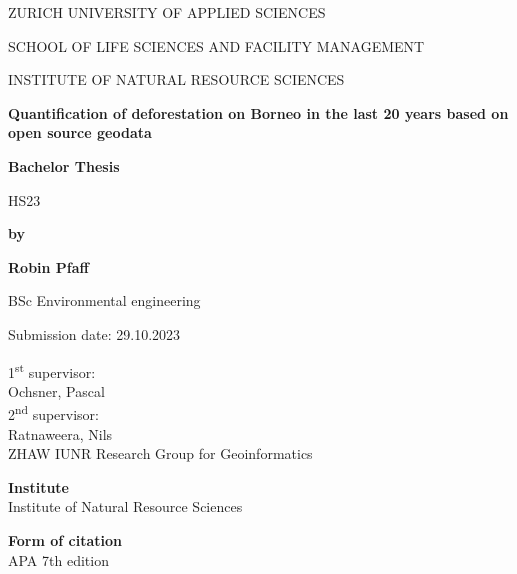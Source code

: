 \documentclass[
  letterpaper,
  DIV=11,
  numbers=noendperiod]{scrreprt}
\author{Robin Pfaff}
\date{2023-10-29}
\begin{document}
\begin{titlepage}
    \centering
    {\fontsize{12}{10}\selectfont ZURICH UNIVERSITY OF APPLIED SCIENCES\par}
    {\fontsize{12}{10}\selectfont SCHOOL OF LIFE SCIENCES AND FACILITY MANAGEMENT\par}
    {\fontsize{12}{10}\selectfont INSTITUTE OF NATURAL RESOURCE SCIENCES\par}
    \vspace{6cm}
    {\fontsize{14}{16}\bfseries Quantification of deforestation on Borneo in the last 20 years based on open source geodata\par}
    {\fontsize{12}{14}\bfseries Bachelor Thesis\par}
    {\fontsize{12}{14}\selectfont HS23\par}
    \vspace{2cm}
    {\fontsize{12}{14}\bfseries by\par}
    {\fontsize{12}{14}\bfseries Robin Pfaff\par}
    {\fontsize{12}{14}\selectfont BSc Environmental engineering\par}
    \vspace{2cm}
    {\fontsize{12}{14}\selectfont Submission date: 29.10.2023\par}

    \vfill
    \begin{flushleft}
        1\textsuperscript{st} supervisor:\\
        Ochsner, Pascal\\
        2\textsuperscript{nd} supervisor:\\
        Ratnaweera, Nils\\
        ZHAW IUNR Research Group for Geoinformatics
    \end{flushleft}
\end{titlepage}

\clearpage
{}
\setcounter{page}{1}

\thispagestyle{empty}
\vspace*{\fill}


\vspace{0.5cm}

\noindent\textbf{Institute}\\
Institute of Natural Resource Sciences

\noindent\textbf{Form of citation}\\
APA 7th edition
\end{document}

